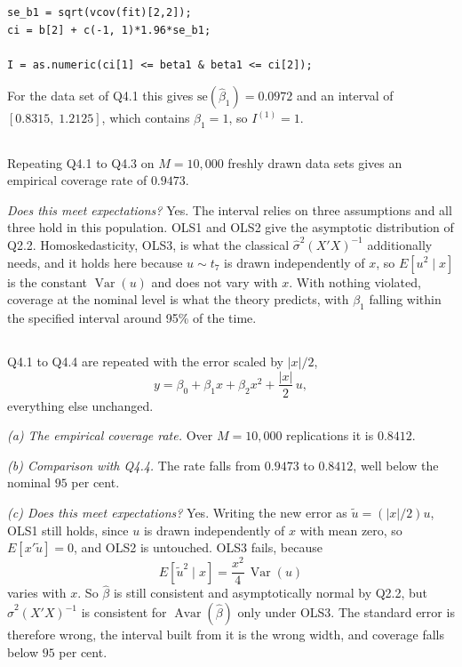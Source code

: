 \documentclass[11pt]{article}
\newcommand{\code}[1]{\texttt{#1}}
\DeclareMathOperator{\Var}{Var}
\DeclareMathOperator{\Avar}{Avar}
\begin{document}
\begin{lstlisting}[style=Rcode,caption={The interval and the indicator
(excerpt from \code{R/q4\_coverage\_rate.R}).},label={lst:q4-ci}]
se_b1 = sqrt(vcov(fit)[2,2]);
ci = b[2] + c(-1, 1)*1.96*se_b1;

I = as.numeric(ci[1] <= beta1 & beta1 <= ci[2]);
\end{lstlisting}

For the data set of Q4.1 this gives $\text{se}(\hat\beta_1) = 0.0972$ and
an interval of $[0.8315,\; 1.2125]$, which contains $\beta_1 = 1$, so
$I^{(1)} = 1$.

\subsection{}
Repeating Q4.1 to Q4.3 on $M = 10{,}000$ freshly drawn data sets gives an
empirical coverage rate of $0.9473$.

\emph{Does this meet expectations?} Yes. The interval relies on three
assumptions and all three hold in this population. OLS1 and OLS2 give the
asymptotic distribution of Q2.2. Homoskedasticity, OLS3, is what the
classical $\hat\sigma^2(X'X)^{-1}$ additionally needs, and it holds here
because $u \sim t_7$ is drawn independently of $x$, so $E[u^2 \mid x]$ is the
constant $\Var(u)$ and does not vary with $x$. With nothing violated, coverage
at the nominal level is what the theory predicts, with $\beta_1$ falling within the specified interval around 95\% of the time.

\subsection{}
Q4.1 to Q4.4 are repeated with the error scaled by $|x|/2$,
\[
y = \beta_0 + \beta_1 x + \beta_2 x^2 + \frac{|x|}{2}\,u ,
\]
everything else unchanged.

\emph{(a) The empirical coverage rate.} Over $M = 10{,}000$ replications it is
$0.8412$.

\emph{(b) Comparison with Q4.4.} The rate falls from $0.9473$ to
$0.8412$, well below the nominal $95$ per cent.

\emph{(c) Does this meet expectations?} Yes. Writing the new error as
$\tilde{u} = (|x|/2)u$, OLS1 still holds, since $u$ is drawn independently of
$x$ with mean zero, so $E[x'\tilde{u}] = 0$, and OLS2 is untouched. OLS3
fails, because
\[
E[\tilde{u}^2 \mid x] = \frac{x^2}{4}\,\Var(u)
\]
varies with $x$. So $\hat\beta$ is still consistent and asymptotically normal
by Q2.2, but $\hat\sigma^2(X'X)^{-1}$ is consistent for $\Avar(\hat\beta)$
only under OLS3. The standard error is therefore wrong, the interval built
from it is the wrong width, and coverage falls below $95$ per cent.
\end{document}
